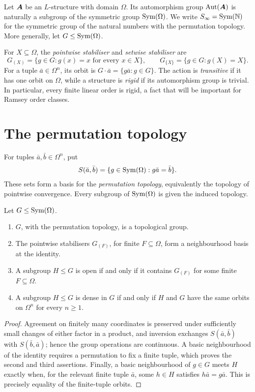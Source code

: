 Let \(\boldsymbol{A}\) be an \(L\)-structure with domain \(\Omega\).  Its automorphism group
\(\operatorname{Aut}(\boldsymbol{A})\) is naturally a subgroup of the symmetric group
\(\operatorname{Sym}(\Omega)\). We write \(S_\infty=\operatorname{Sym}(\mathbb{N})\) for the symmetric
group of the natural numbers with the permutation topology. More generally,
let \(G\leq\operatorname{Sym}(\Omega)\).

For \(X\subseteq\Omega\), the \emph{pointwise stabiliser} and
\emph{setwise stabiliser} are
\[
    G_{(X)}=\{g\in G:g(x)=x\text{ for every }x\in X\},
    \qquad
    G_{\{X\}}=\{g\in G:g(X)=X\}.
\]
For a tuple \(\bar a\in\Omega^n\), its orbit is
\(G\cdot\bar a=\{g\bar a:g\in G\}\).  The action is
\emph{transitive} if it has one orbit on \(\Omega\), while a structure is
\emph{rigid} if its automorphism group is trivial.  In particular, every
finite linear order is rigid, a fact that will be important for Ramsey order
classes.

\section{The permutation topology}

For tuples \(\bar a,\bar b\in\Omega^n\), put
\[
    S(\bar a,\bar b)
    =\{g\in\operatorname{Sym}(\Omega):g\bar a=\bar b\}.
\]
These sets form a basis for the \emph{permutation topology}, equivalently the
topology of pointwise convergence.  Every subgroup of \(\operatorname{Sym}(\Omega)\) is
given the induced topology.

\begin{proposition}
    \label{prop:permutation-topology}
    Let \(G\leq\operatorname{Sym}(\Omega)\).
    \begin{enumerate}
        \item \(G\), with the permutation topology, is a topological group.
        \item The pointwise stabilisers \(G_{(F)}\), for finite
              \(F\subseteq\Omega\), form a neighbourhood basis at the
              identity.
        \item A subgroup \(H\leq G\) is open if and only if it contains
              \(G_{(F)}\) for some finite \(F\subseteq\Omega\).
        \item A subgroup \(H\leq G\) is dense in \(G\) if and only if \(H\)
              and \(G\) have the same orbits on \(\Omega^n\) for every
              \(n\geq1\).
    \end{enumerate}
\end{proposition}

\begin{proof}
    Agreement on finitely many coordinates is preserved under sufficiently
    small changes of either factor in a product, and inversion exchanges
    \(S(\bar a,\bar b)\) with \(S(\bar b,\bar a)\); hence the group operations
    are continuous.  A basic neighbourhood of the identity requires a
    permutation to fix a finite tuple, which proves the second and third
    assertions.  Finally, a basic neighbourhood of \(g\in G\) meets \(H\)
    exactly when, for the relevant finite tuple \(\bar a\), some
    \(h\in H\) satisfies \(h\bar a=g\bar a\).  This is precisely equality of
    the finite-tuple orbits.
\end{proof}

